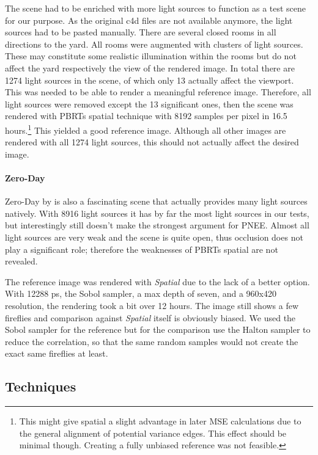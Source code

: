 The scene had to be enriched with more light sources to function as a test scene for our purpose. As the original c4d files are not available anymore, the light sources had to be pasted manually. There are several closed rooms in all directions to the yard. All rooms were augmented with clusters of light sources. These may constitute some realistic illumination within the rooms but do not affect the yard respectively the view of the rendered image. In total there are 1274 light sources in the scene, of which only 13 actually affect the viewport. This was needed to be able to render a meaningful reference image. Therefore, all light sources were removed except the 13 significant ones, then the scene was rendered with PBRTs spatial technique with 8192 samples per pixel in 16.5 hours.\footnote{This might give spatial a slight advantage in later MSE calculations due to the general alignment of potential variance edges. This effect should be minimal though. Creating a fully unbiased reference was not feasible.} This yielded a good reference image. Although all other images are rendered with all 1274 light sources, this should not actually affect the desired image.

\paragraph{Zero-Day}

Zero-Day by \textcite{Beeple} is also a fascinating scene that actually provides many light sources natively. With 8916 light sources it has by far the most light sources in our tests, but interestingly still doesn't make the strongest argument for PNEE. Almost all light sources are very weak and the scene is quite open, thus occlusion does not play a significant role; therefore the weaknesses of PBRTs spatial are not revealed.

The reference image was rendered with \textit{Spatial} due to the lack of a better option. With 12288 ps, the Sobol sampler, a max depth of seven, and a 960x420 resolution, the rendering took a bit over 12 hours. The image still shows a few fireflies and comparison against \textit{Spatial} itself is obviously biased. We used the Sobol sampler for the reference but for the comparison use the Halton sampler to reduce the correlation, so that the same random samples would not create the exact same fireflies at least.

\FloatBarrier
\subsection{Techniques}


